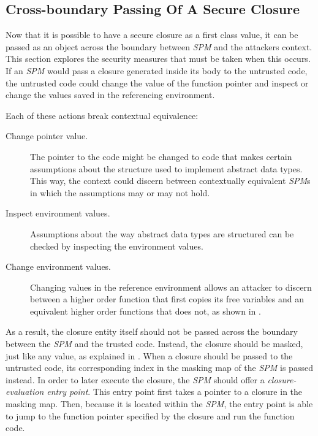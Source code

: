 \subsection{Cross-boundary Passing Of A Secure Closure }
Now that it is possible to have a secure closure as a first class value, it can be passed as an object across the boundary between \emph{SPM} and the attackers context.
This section explores the security measures that must be taken when this occurs.
If an \emph{SPM} would pass a closure generated inside its body to the untrusted code, the untrusted code could change the value of the function pointer and inspect or change the values saved in the referencing environment.

Each of these actions break contextual equivalence:
\begin{description}
\item[Change pointer value.] The pointer to the code might be changed to code that makes certain assumptions about the structure used to implement abstract data types.
This way, the context could discern between contextually equivalent \emph{SPM}s in which the assumptions may or may not hold. 
\item[Inspect environment values.]
Assumptions about the way abstract data types are structured can be checked by inspecting the environment values.
\item[Change environment values.] Changing values in the reference environment allows an attacker to discern between a higher order function that first copies its free variables and an equivalent higher order functions that does not, as shown in .
\end{description}

As a result, the closure entity itself should not be passed across the boundary between the \emph{SPM} and the trusted code.
Instead, the closure should be masked, just like any value, as explained in . When a closure should be passed to the untrusted code, its corresponding index in the masking map of the \emph{SPM} is passed instead.
In order to later execute the closure, the \emph{SPM} should offer a \emph{closure-evaluation entry point}.
This entry point first takes a pointer to a closure in the masking map.
Then, because it is located within the \emph{SPM}, the entry point is able to jump to the function pointer specified by the closure and run the function code.

